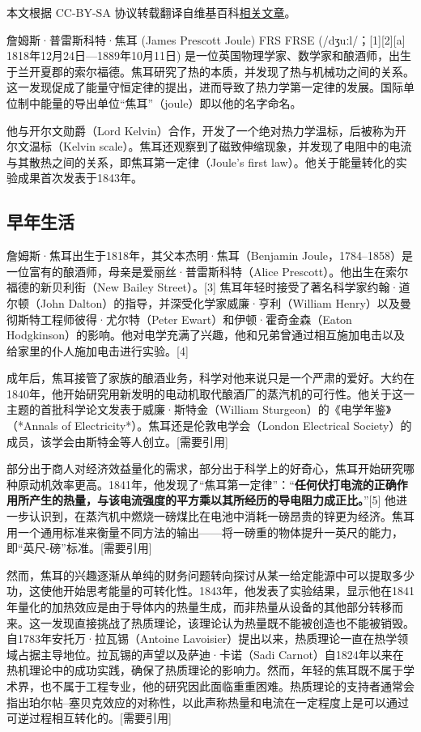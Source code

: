 
本文根据 CC-BY-SA 协议转载翻译自维基百科\href{https://en.wikipedia.org/wiki/James_Prescott_Joule}{相关文章}。

詹姆斯·普雷斯科特·焦耳 (James Prescott Joule) FRS FRSE (/dʒuːl/；[1][2][a] 1818年12月24日—1889年10月11日) 是一位英国物理学家、数学家和酿酒师，出生于兰开夏郡的索尔福德。焦耳研究了热的本质，并发现了热与机械功之间的关系。这一发现促成了能量守恒定律的提出，进而导致了热力学第一定律的发展。国际单位制中能量的导出单位“焦耳”（joule）即以他的名字命名。

他与开尔文勋爵（Lord Kelvin）合作，开发了一个绝对热力学温标，后被称为开尔文温标（Kelvin scale）。焦耳还观察到了磁致伸缩现象，并发现了电阻中的电流与其散热之间的关系，即焦耳第一定律（Joule's first law）。他关于能量转化的实验成果首次发表于1843年。

\subsection{早年生活} 
詹姆斯·焦耳出生于1818年，其父本杰明·焦耳（Benjamin Joule，1784–1858）是一位富有的酿酒师，母亲是爱丽丝·普雷斯科特（Alice Prescott）。他出生在索尔福德的新贝利街（New Bailey Street）。[3] 焦耳年轻时接受了著名科学家约翰·道尔顿（John Dalton）的指导，并深受化学家威廉·亨利（William Henry）以及曼彻斯特工程师彼得·尤尔特（Peter Ewart）和伊顿·霍奇金森（Eaton Hodgkinson）的影响。他对电学充满了兴趣，他和兄弟曾通过相互施加电击以及给家里的仆人施加电击进行实验。[4]  

成年后，焦耳接管了家族的酿酒业务，科学对他来说只是一个严肃的爱好。大约在1840年，他开始研究用新发明的电动机取代酿酒厂的蒸汽机的可行性。他关于这一主题的首批科学论文发表于威廉·斯特金（William Sturgeon）的《电学年鉴》（*Annals of Electricity*）。焦耳还是伦敦电学会（London Electrical Society）的成员，该学会由斯特金等人创立。[需要引用]  

部分出于商人对经济效益量化的需求，部分出于科学上的好奇心，焦耳开始研究哪种原动机效率更高。1841年，他发现了“焦耳第一定律”：“\textbf{任何伏打电流的正确作用所产生的热量，与该电流强度的平方乘以其所经历的导电阻力成正比。}”[5] 他进一步认识到，在蒸汽机中燃烧一磅煤比在电池中消耗一磅昂贵的锌更为经济。焦耳用一个通用标准来衡量不同方法的输出——将一磅重的物体提升一英尺的能力，即“英尺-磅”标准。[需要引用]  

然而，焦耳的兴趣逐渐从单纯的财务问题转向探讨从某一给定能源中可以提取多少功，这使他开始思考能量的可转化性。1843年，他发表了实验结果，显示他在1841年量化的加热效应是由于导体内的热量生成，而非热量从设备的其他部分转移而来。这一发现直接挑战了热质理论，该理论认为热量既不能被创造也不能被销毁。自1783年安托万·拉瓦锡（Antoine Lavoisier）提出以来，热质理论一直在热学领域占据主导地位。拉瓦锡的声望以及萨迪·卡诺（Sadi Carnot）自1824年以来在热机理论中的成功实践，确保了热质理论的影响力。然而，年轻的焦耳既不属于学术界，也不属于工程专业，他的研究因此面临重重困难。热质理论的支持者通常会指出珀尔帖–塞贝克效应的对称性，以此声称热量和电流在一定程度上是可以通过可逆过程相互转化的。[需要引用]  

